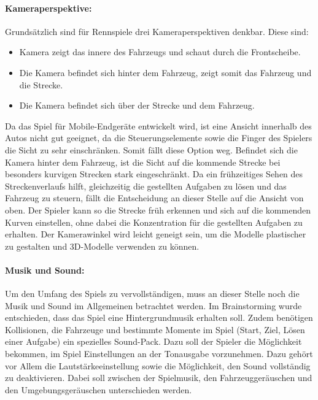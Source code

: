 		\paragraph{Kameraperspektive:}
		Grundsätzlich sind für Rennspiele drei Kameraperspektiven denkbar. Diese sind:
		\begin{itemize}
			\item{ Kamera zeigt das innere des Fahrzeugs und schaut durch die Frontscheibe. }
			\item{ Die Kamera befindet sich hinter dem Fahrzeug, zeigt somit das Fahrzeug und die Strecke. }
			\item{ Die Kamera befindet sich über der Strecke und dem Fahrzeug. }
		\end{itemize}
		Da das Spiel für Mobile-Endgeräte entwickelt wird, ist eine Ansicht innerhalb des Autos nicht gut geeignet, da die Steuerungselemente sowie die Finger des Spielers die Sicht zu sehr einschränken. Somit fällt diese Option weg.
		Befindet sich die Kamera hinter dem Fahrzeug, ist die Sicht auf die kommende Strecke bei besonders kurvigen Strecken stark eingeschränkt. Da ein frühzeitiges Sehen des Streckenverlaufs hilft, gleichzeitig die gestellten Aufgaben zu lösen und das Fahrzeug zu steuern, fällt die Entscheidung an dieser Stelle auf die Ansicht von oben.
		Der Spieler kann so die Strecke früh erkennen und sich auf die kommenden Kurven einstellen, ohne dabei die Konzentration für die gestellten Aufgaben zu erhalten. Der Kamerawinkel wird leicht geneigt sein, um die Modelle plastischer zu gestalten und 3D-Modelle verwenden zu können.

		\paragraph{Musik und Sound:}
		Um den Umfang des Spiels zu vervollständigen, muss an dieser Stelle noch die Musik und Sound im Allgemeinen betrachtet werden. Im Brainstorming wurde entschieden, dass das Spiel eine Hintergrundmusik erhalten soll. Zudem benötigen Kollisionen, die Fahrzeuge und bestimmte Momente im Spiel (Start, Ziel, Lösen einer Aufgabe) ein spezielles Sound-Pack.
		Dazu soll der Spieler die Möglichkeit bekommen, im Spiel Einstellungen an der Tonausgabe vorzunehmen. Dazu gehört vor Allem die Lautstärkeeinstellung sowie die Möglichkeit, den Sound vollständig zu deaktivieren. Dabei soll zwischen der Spielmusik, den Fahrzeuggeräuschen und den Umgebungsgeräuschen unterschieden werden.

